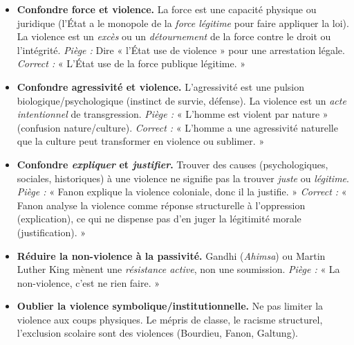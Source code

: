 \documentclass[11pt]{article}
\newcommand{\cle}[1]{{\popxbold\color{popdark}#1}}
\begin{document}
\begin{attention}
\begin{itemize}
\item \textbf{Confondre \cle{force} et \cle{violence}.} La force est une capacité physique ou juridique (l'État a le monopole de la \emph{force légitime} pour faire appliquer la loi). La violence est un \emph{excès} ou un \emph{détournement} de la force contre le droit ou l'intégrité. \textit{Piège :} Dire « l'État use de violence » pour une arrestation légale. \textit{Correct :} « L'État use de la force publique légitime. »
\item \textbf{Confondre \cle{agressivité} et \cle{violence}.} L'agressivité est une pulsion biologique/psychologique (instinct de survie, défense). La violence est un \emph{acte intentionnel} de transgression. \textit{Piège :} « L'homme est violent par nature » (confusion nature/culture). \textit{Correct :} « L'homme a une agressivité naturelle que la culture peut transformer en violence ou sublimer. »
\item \textbf{Confondre \emph{expliquer} et \emph{justifier}.} Trouver des causes (psychologiques, sociales, historiques) à une violence ne signifie pas la trouver \emph{juste} ou \emph{légitime}. \textit{Piège :} « Fanon explique la violence coloniale, donc il la justifie. » \textit{Correct :} « Fanon analyse la violence comme réponse structurelle à l'oppression (explication), ce qui ne dispense pas d'en juger la légitimité morale (justification). »
\item \textbf{Réduire la non-violence à la passivité.} Gandhi (\emph{Ahimsa}) ou Martin Luther King mènent une \emph{résistance active}, non une soumission. \textit{Piège :} « La non-violence, c'est ne rien faire. »
\item \textbf{Oublier la violence symbolique/institutionnelle.} Ne pas limiter la violence aux coups physiques. Le mépris de classe, le racisme structurel, l'exclusion scolaire sont des violences (Bourdieu, Fanon, Galtung).
\end{itemize}
\end{attention}
\end{document}

